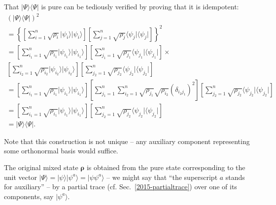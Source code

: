 {\color{OliveGreen}\bproof
That $\vert \Psi\rangle \langle \Psi \vert$ is pure can be tediously verified by proving that it is idempotent:
\begin{equation}
\begin{split}
(\vert \Psi\rangle \langle \Psi \vert )^2
\\=
\left\{
\left[\sum_{i=1}^n \sqrt{\rho_i}  \vert \psi_i\rangle  \vert \psi_i\rangle \right]
\left[\sum_{j=1}^n \sqrt{\rho_j}  \langle  \psi_j\vert \langle \psi_j\vert \right]
\right\}^2
\\=
\left[\sum_{i_1=1}^n \sqrt{\rho_{i_1}}  \vert \psi_{i_1}\rangle  \vert \psi_{i_1}\rangle \right]
\left[\sum_{j_1=1}^n \sqrt{\rho_{j_1}}  \langle  \psi_{j_1}\vert \langle \psi_{j_1}\vert \right]\times \\
\left[\sum_{i_2=1}^n \sqrt{\rho_{i_2}}  \vert \psi_{i_2}\rangle  \vert \psi_{i_2}\rangle \right]
\left[\sum_{j_2=1}^n \sqrt{\rho_{j_2}}  \langle  \psi_{j_2}\vert \langle \psi_{j_2}\vert \right]
\qquad
\\=
\left[\sum_{i_1=1}^n \sqrt{\rho_{i_1}}  \vert \psi_{i_1}\rangle  \vert \psi_{i_1}\rangle \right]
\left[\sum_{j_1=1}^n \sum_{i_2=1}^n \sqrt{\rho_{j_1}}\sqrt{\rho_{i_2}}  (\delta_{i_2 j_1})^2 \right]
\left[\sum_{j_2=1}^n \sqrt{\rho_{j_2}}  \langle  \psi_{j_2}\vert \langle \psi_{j_2}\vert \right]
\\=
\left[\sum_{i_1=1}^n \sqrt{\rho_{i_1}}  \vert \psi_{i_1}\rangle  \vert \psi_{i_1}\rangle \right]
\left[\sum_{j_2=1}^n \sqrt{\rho_{j_2}}  \langle  \psi_{j_2}\vert \langle \psi_{j_2}\vert \right]
\\=  \vert \Psi\rangle \langle \Psi \vert
.
\label{2015-puranproof}
\end{split}
\end{equation}
}

Note that this construction is not unique -- any auxiliary component representing some orthonormal basis would suffice.

The original mixed state ${\boldsymbol{\rho}}$ is obtained from the pure state
corresponding to the unit vector $\vert \Psi\rangle = \vert \psi \rangle \vert \psi^a \rangle  = \vert \psi \psi^a \rangle$
-- we might say that ``the superscript $a$ stands for auxiliary'' --
by a partial trace (cf. Sec.~\ref{2015-partialtrace}) over one of its components, say  $\vert \psi^a\rangle$.

